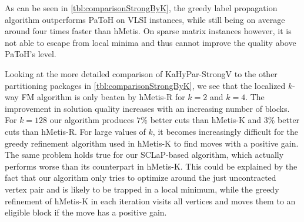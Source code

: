 \documentclass[runningheads,a4paper]{llncs}
\begin{document}
As can be seen in \autoref{tbl:comparisonStrongByK}, the greedy label propagation algorithm outperforms PaToH on VLSI instances, while still being on average
around four times faster than hMetis. On sparse matrix instances however, it is not able to escape from local minima and thus cannot improve the quality
above PaToH's level.  

Looking at the more detailed comparison of KaHyPar-StrongV to the other partitioning packages in \autoref{tbl:comparisonStrongByK}, we see that the localized $k$-way
FM algorithm is only beaten by hMetis-R for $k=2$ and $k=4$. The improvement in solution quality increases with an increasing number of blocks. For $k=128$ our algorithm
produces $7\%$ better cuts than hMetis-K and $3\%$ better cuts than hMetis-R.
For large values of $k$, it becomes increasingly difficult for the greedy refinement algorithm used in hMetis-K to find moves with a positive gain.
The same problem holds true for our SCLaP-based algorithm, which actually performs worse than its counterpart in hMetis-K.
This could be explained by the fact that our algorithm only tries to optimize around the just uncontracted vertex pair and is likely to be trapped in a local
minimum, while the greedy refinement of hMetis-K in each iteration visits all vertices and moves them to an eligible block if the move has a positive gain. 
\end{document}
